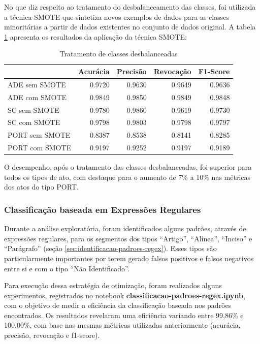 No que diz respeito ao tratamento do desbalanceamento das classes, foi utilizada a técnica SMOTE\cite{Smote2002} que sintetiza novos exemplos de dados para as classes minoritárias a partir de dados existentes no conjunto de dados original. A tabela \ref{tab:resultados-oversampling} apresenta os resultados da aplicação da técnica SMOTE:

\begin{table}[h]
\caption{Tratamento de classes desbalanceadas}
\label{tab:resultados-oversampling}
	\begin{center}
	\begin{tabular}{lrrrr}
		\toprule
		{} &  Acurácia &  Precisão &  Revocação &      F1-Score \\
		\midrule
		ADE sem SMOTE        &    0.9720 &    0.9630 &     0.9649 &  0.9636 \\
		ADE com SMOTE    &    0.9849 &    0.9850 &     0.9849 &  0.9848 \\
		SC sem SMOTE     &    0.9780 &    0.9860 &     0.9619 &  0.9730 \\
		SC com SMOTE &    0.9798 &    0.9803 &     0.9798 &  0.9797 \\
		PORT sem SMOTE     &    0.8387 &    0.8538 &     0.8141 &  0.8285 \\
		PORT com SMOTE &    0.9197 &    0.9252 &     0.9197 &  0.9189 \\
		\bottomrule
	\end{tabular}
	\end{center}		
\end{table}

O desempenho, após o tratamento das classes desbalanceadas, foi superior para todos os tipos de ato, com destaque para o aumento de 7\% a 10\% nas métricas dos atos do tipo PORT.

\subsubsection{Classificação baseada em Expressões Regulares}

Durante a análise exploratória, foram identificados alguns padrões, através de expressões regulares, para os segmentos dos tipos ``Artigo'', ``Alínea'', ``Inciso'' e ``Parágrafo'' (seção \ref{sec:identificacao-padroes-regex}). Esses tipos são particularmente importantes por terem gerado falsos positivos e falsos negativos entre si e com o tipo ``Não Identificado''.

Para execução dessa estratégia de otimização, foram realizados alguns experimentos, registrados no notebook \textbf{classificacao-padroes-regex.ipynb}, com o objetivo de medir a eficiência da classificação baseada nos padrões encontrados. Os resultados revelaram uma eficiência variando entre 99,86\% e 100,00\%, com base nas mesmas métricas utilizadas anteriormente (acurácia,  precisão, revocação e f1-score).

